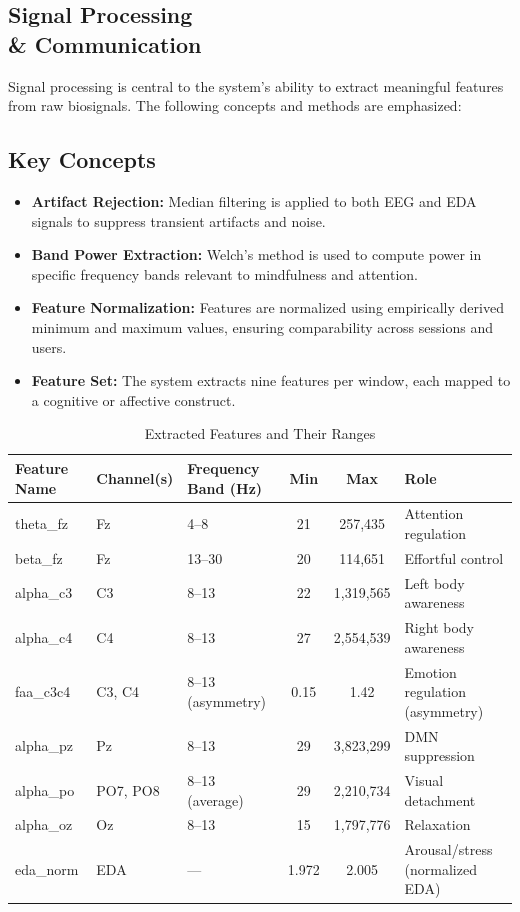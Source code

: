 \subsection{Signal Processing \\& Communication}
\label{sec:signal_processing}

Signal processing is central to the system’s ability to extract meaningful features from raw biosignals. The following concepts and methods are emphasized:

\subsection{Key Concepts}
\begin{itemize}
    \item \textbf{Artifact Rejection:} Median filtering is applied to both EEG and EDA signals to suppress transient artifacts and noise.
    \item \textbf{Band Power Extraction:} Welch’s method is used to compute power in specific frequency bands relevant to mindfulness and attention.
    \item \textbf{Feature Normalization:} Features are normalized using empirically derived minimum and maximum values, ensuring comparability across sessions and users.
    \item \textbf{Feature Set:} The system extracts nine features per window, each mapped to a cognitive or affective construct.
\end{itemize}

\begin{table}[h!]
\centering
\caption{Extracted Features and Their Ranges}
\begin{tabular}{|l|l|l|c|c|l|}
\hline
\textbf{Feature Name} & \textbf{Channel(s)} & \textbf{Frequency Band (Hz)} & \textbf{Min} & \textbf{Max} & \textbf{Role} \\
\hline
theta\_fz & Fz & 4--8 & 21 & 257,435 & Attention regulation \\
beta\_fz & Fz & 13--30 & 20 & 114,651 & Effortful control \\
alpha\_c3 & C3 & 8--13 & 22 & 1,319,565 & Left body awareness \\
alpha\_c4 & C4 & 8--13 & 27 & 2,554,539 & Right body awareness \\
faa\_c3c4 & C3, C4 & 8--13 (asymmetry) & 0.15 & 1.42 & Emotion regulation (asymmetry) \\
alpha\_pz & Pz & 8--13 & 29 & 3,823,299 & DMN suppression \\
alpha\_po & PO7, PO8 & 8--13 (average) & 29 & 2,210,734 & Visual detachment \\
alpha\_oz & Oz & 8--13 & 15 & 1,797,776 & Relaxation \\
eda\_norm & EDA & --- & 1.972 & 2.005 & Arousal/stress (normalized EDA) \\
\hline
\end{tabular}
\end{table}

